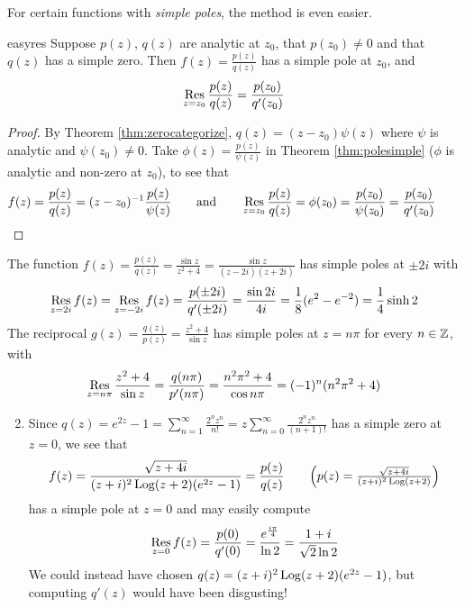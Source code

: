 
For certain functions with \emph{simple poles}, the method is even easier.

\begin{cor}{}{easyres}
	Suppose $p(z)$, $q(z)$ are analytic at $z_0$, that $p(z_0)\neq 0$ and that $q(z)$ has a simple zero. Then $f(z)=\frac{p(z)}{q(z)}$ has a simple pole at $z_0$, and
	\[
		\operatorname*{Res}_{z=z_0}\frac{p(z)}{q(z)} =\frac{p(z_0)}{q'(z_0)}
	\]
\end{cor}

\begin{proof}
	By Theorem \ref{thm:zerocategorize}, $q(z)=(z-z_0)\psi(z)$ where $\psi$ is analytic and $\psi(z_0)\neq 0$. Take $\phi(z)=\frac{p(z)}{\psi(z)}$ in Theorem \ref{thm:polesimple} ($\phi$ is analytic and non-zero at $z_0$), to see that
	\[
		f(z)=\frac{p(z)}{q(z)}=(z-z_0)^{-1}\frac{p(z)}{\psi(z)}
		\qquad \text{and}\qquad
		\operatorname*{Res}_{z=z_0}\frac{p(z)}{q(z)}=\phi(z_0)
		=\frac{p(z_0)}{\psi(z_0)}=\frac{p(z_0)}{q'(z_0)}
		\tag*{\qedhere}
	\]
\end{proof}


\begin{examples}{}{}
	\exstart The function $f(z)=\frac{p(z)}{q(z)}=\frac{\sin z}{z^2+4} =\frac{\sin z}{(z-2i)(z+2i)}$ has simple poles at $\pm 2i$ with 
  \[
  	\operatorname*{Res}_{z=2i}f(z)=\operatorname*{Res}_{z=-2i}f(z)
  	=\frac{p(\pm 2i)}{q'(\pm 2i)}
  	=\frac{\sin 2i}{4i}=\frac 18(e^2-e^{-2}) =\frac 14\sinh 2
  \]
  The reciprocal $g(z)=\frac{q(z)}{p(z)} =\frac{z^2+4}{\sin z}$ has simple poles at $z=n\pi$ for every $n\in\mathbb{Z}$, with
  \[
  	\operatorname*{Res}_{z=n\pi}\frac{z^2+4}{\sin z}
  	=\frac{q(n\pi)}{p'(n\pi)}
  	=\frac{n^2\pi^2+4}{\cos n\pi}
  	=(-1)^n(n^2\pi^2+4)
  \]
	\begin{enumerate}\setcounter{enumi}{1}
	  \item Since $q(z)=e^{2z}-1=\sum\limits_{n=1}^\infty\frac{2^nz^n}{n!}=z\sum\limits_{n=0}^\infty\frac{2^nz^n}{(n+1)!}$ has a simple zero at $z=0$, we see that
	  \[
	  	f(z)=\frac{\sqrt{z+4i}}{(z+i)^2\Log(z+2)(e^{2z}-1)}=\frac{p(z)}{q(z)} 
	  	\tag*{$\left(p(z)=\frac{\sqrt{z+4i}}{(z+i)^2\Log(z+2)}\right)$}
	  \]
	  has a simple pole at $z=0$ and may easily compute
	  \[
	  	\operatorname*{Res}_{z=0}f(z)=\frac{p(0)}{q'(0)}=\frac{e^{\frac{i\pi}{4}}}{\ln 2} =\frac{1+i}{\sqrt 2\ln 2}
	  \]
	  We could instead have chosen $q(z)=(z+i)^2\operatorname{Log}(z+2)(e^{2z}-1)$, but computing $q'(z)$ would have been disgusting!
	\end{enumerate}
\end{examples}


